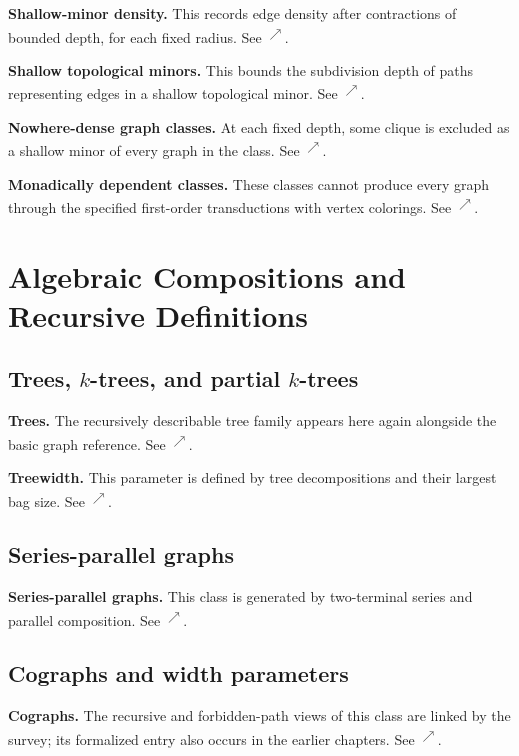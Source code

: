 \documentclass[11pt]{article}
\newcommand{\source}[2]{\textsuperscript{\href{https://laxarchive.org/#1/#2.html}{$\nearrow$}}}
\newcommand{\surveychapter}[2]{\setcounter{section}{#1}\section{#2}}
\begin{document}
\textbf{Shallow-minor density.}
This records edge density after contractions
of bounded depth, for each fixed radius. See
\source{lax-199508}{Lax199508.ShallowMinorDensity}.

\textbf{Shallow topological minors.}
This bounds the subdivision depth of
paths representing edges in a shallow topological minor. See
\source{lax-199508}{Lax199508.ShallowTopologicalMinors}.

\textbf{Nowhere-dense graph classes.}
At each fixed depth, some clique is
excluded as a shallow minor of every graph in the class. See
\source{lax-199508}{Lax199508.NowhereDenseClasses}.

\textbf{Monadically dependent classes.}
These classes cannot produce every
graph through the specified first-order transductions with vertex colorings.
See \source{lax-710763}{Lax710763.MonadicDependence}.
\clearpage
\surveychapter{10}{Algebraic Compositions and Recursive Definitions}

\subsection{Trees, $k$-trees, and partial $k$-trees}

\textbf{Trees.}
The recursively describable tree family appears here again
alongside the basic graph reference. See \source{lax-68}{Lax68.Trees}.

\textbf{Treewidth.}
This parameter is defined by tree decompositions and
their largest bag size. See \source{lax-228581}{Lax228581.Treewidth}.
\subsection{Series-parallel graphs}

\textbf{Series-parallel graphs.}
This class is generated by two-terminal
series and parallel composition. See
\source{lax-68}{Lax68.SeriesParallel}.
\subsection{Cographs and width parameters}

\textbf{Cographs.}
The recursive and forbidden-path views of this class are
linked by the survey; its formalized entry also occurs in the earlier
chapters. See \source{lax-214022}{Lax214022.Cographs}.
\end{document}
